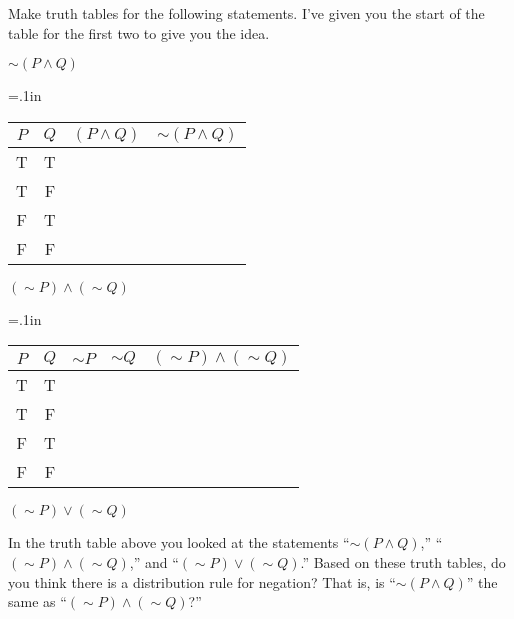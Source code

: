 \begin{question}[resume]
\item Make truth tables for the following statements.  I've given you the start of the table for the first two to give you the idea.
	\begin{qpart}
	\item $\sim\!( P \wedge Q)$\\
	
		{\tabulinesep=.1in
		\begin{tabu}{|cc|c:c|}
		\hline
		$P$ & $Q$ &$ (P \wedge Q)$ & $\sim\!(P \wedge Q)$\\
		\hline
		T & T & \ & \ \\
		T & F & \ & \ \\
		F & T & \ & \ \\
		F & F & \ & \ \\
		\hline
		\end{tabu}}
		\medskip
	\item $(\sim\!P) \wedge (\sim\!Q)$\\
	
	{\tabulinesep=.1in
	\begin{tabu}{|cc|c:c:c|}
		\hline
		$P$ & $Q$ &$ \sim\!P$ & $\sim\!Q$ & $(\sim\!P) \wedge (\sim\!Q)$\\
		\hline
		T & T & \ & \ & \ \\
		T & F & \ & \ & \ \\
		F & T & \ & \ & \ \\
		F & F & \ & \ & \ \\
		\hline
		\end{tabu}}

	\item $(\sim\!P) \vee (\sim\!Q)$
	
	\vspace{3in}
	
	\end{qpart}
	
\item In the truth table above you looked at the statements ``$\sim\!( P \wedge Q)$,'' ``$(\sim\!P) \wedge (\sim\!Q)$,'' and ``$(\sim\!P) \vee (\sim\!Q)$.''  Based on these truth tables, do you think there is a distribution rule for negation?  That is, is ``$\sim\!( P \wedge Q)$'' the same as ``$(\sim\!P) \wedge (\sim\!Q)$?''

\vspace{.75in}

\end{question}

